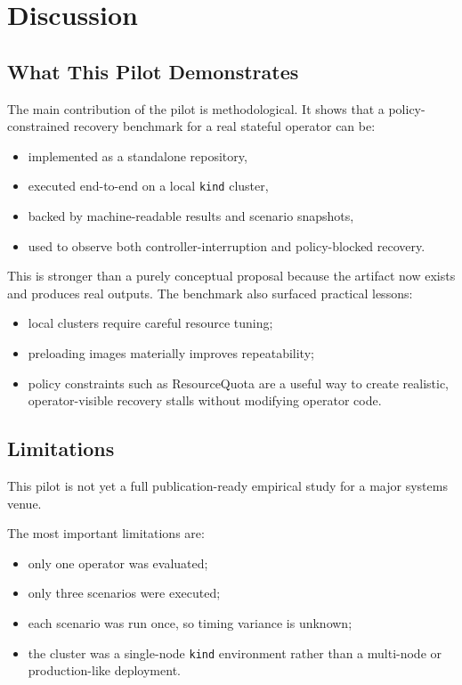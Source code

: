 \documentclass[11pt,a4paper]{article}
\begin{document}
\section{Discussion}

\subsection{What This Pilot Demonstrates}

The main contribution of the pilot is methodological. It shows that a
policy-constrained recovery benchmark for a real stateful operator can be:

\begin{itemize}
  \item implemented as a standalone repository,
  \item executed end-to-end on a local \texttt{kind} cluster,
  \item backed by machine-readable results and scenario snapshots,
  \item used to observe both controller-interruption and policy-blocked recovery.
\end{itemize}

This is stronger than a purely conceptual proposal because the artifact now
exists and produces real outputs. The benchmark also surfaced practical lessons:

\begin{itemize}
  \item local clusters require careful resource tuning;
  \item preloading images materially improves repeatability;
  \item policy constraints such as ResourceQuota are a useful way to create
  realistic, operator-visible recovery stalls without modifying operator code.
\end{itemize}

\subsection{Limitations}

This pilot is not yet a full publication-ready empirical study for a major
systems venue.

The most important limitations are:

\begin{itemize}
  \item only one operator was evaluated;
  \item only three scenarios were executed;
  \item each scenario was run once, so timing variance is unknown;
  \item the cluster was a single-node \texttt{kind} environment rather than a
  multi-node or production-like deployment.
\end{itemize}
\end{document}
